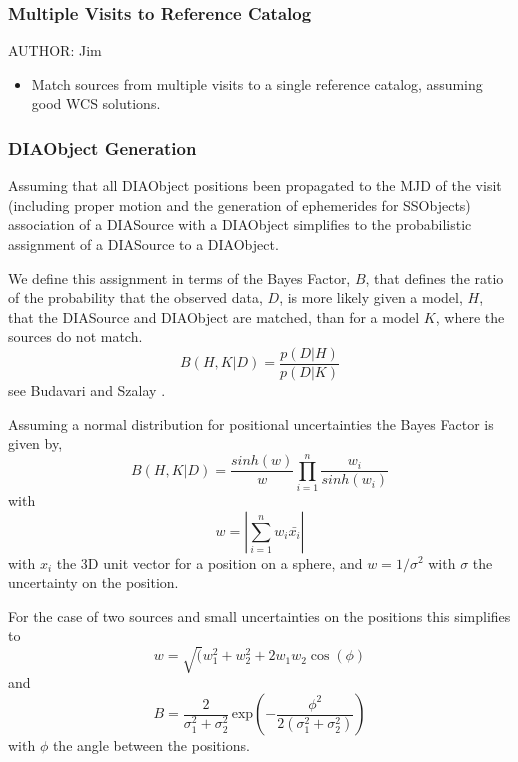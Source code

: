 


\subsubsection{Multiple Visits to Reference Catalog}
\label{sec:acJointCalMatching}
AUTHOR: Jim
\begin{itemize}
\item Match sources from multiple visits to a single reference catalog, assuming good WCS solutions.
\end{itemize}

\subsubsection{DIAObject Generation}
\label{sec:acDIAObjectGeneration}

Assuming that all DIAObject positions been propagated to the MJD of
the visit (including proper motion and the generation of ephemerides
for SSObjects) association of a DIASource with a DIAObject simplifies
to the probabilistic assignment of a DIASource to a DIAObject.

We define this assignment in terms of the Bayes Factor, $B$, that defines
the ratio of the probability that the observed data, $D$, is more
likely given a model, $H$, that the DIASource and DIAObject are
matched, than for a model $K$, where the sources do not match.
\begin{equation}
B(H,K|D) = \frac{p(D|H)}{p(D|K)}
\end{equation}
see Budavari and Szalay \cite{2008ApJ...679..301B}.

Assuming a normal distribution for positional uncertainties the Bayes
Factor is given by,
\begin{equation}
B(H,K|D) = \frac{sinh (w)}{w} \prod_{i=1}^n \frac{w_i}{sinh (w_i)}
\end{equation}
with
\begin{equation}
w = |\sum_{i=1}^n w_i \bar{x_i} |
\end{equation}
with $x_i$ the 3D unit vector for a position on a sphere, and
$w=1/\sigma^2$ with $\sigma$ the uncertainty on the position.

For the case of two sources and small uncertainties on the positions this simplifies to
\begin{equation}
w = \sqrt(w_1^2 + w_2^2 +2 w_1 w_2 \cos(\phi)
\end{equation}
and
\begin{equation}
B=\frac{2}{\sigma_1^2 + \sigma_2^2} \, \textrm{exp}(-\frac{\phi^2}{2(\sigma_1^2 + \sigma_2^2)})
\end{equation}
with $\phi$ the angle between the positions.


